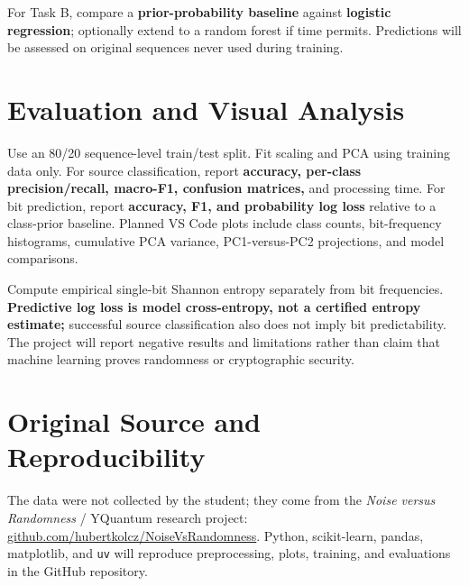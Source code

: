 \documentclass[11pt,letterpaper,twocolumn]{article}
\begin{document}
For Task B, compare a \textbf{prior-probability baseline} against \textbf{logistic regression}; optionally extend to a random forest if time permits. Predictions will be assessed on original sequences never used during training.

\section{Evaluation and Visual Analysis}
Use an 80/20 sequence-level train/test split. Fit scaling and PCA using training data only. For source classification, report \textbf{accuracy, per-class precision/recall, macro-F1, confusion matrices,} and processing time. For bit prediction, report \textbf{accuracy, F1, and probability log loss} relative to a class-prior baseline. Planned VS Code plots include class counts, bit-frequency histograms, cumulative PCA variance, PC1-versus-PC2 projections, and model comparisons.

Compute empirical single-bit Shannon entropy separately from bit frequencies. \textbf{Predictive log loss is model cross-entropy, not a certified entropy estimate;} successful source classification also does not imply bit predictability. The project will report negative results and limitations rather than claim that machine learning proves randomness or cryptographic security.

\section{Original Source and Reproducibility}
The data were not collected by the student; they come from the \emph{Noise versus Randomness} / YQuantum research project: \href{https://github.com/hubertkolcz/NoiseVsRandomness}{github.com/hubertkolcz/NoiseVsRandomness}. Python, scikit-learn, pandas, matplotlib, and \texttt{uv} will reproduce preprocessing, plots, training, and evaluations in the GitHub repository.
\end{document}
